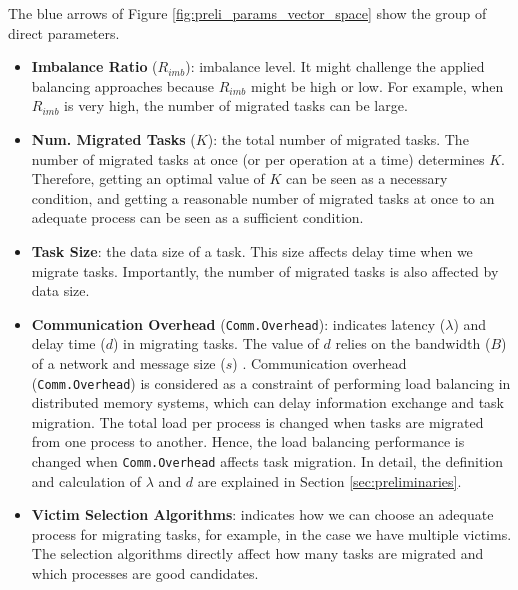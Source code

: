 The blue arrows of Figure \ref{fig:preli_params_vector_space} show the group of direct parameters.
\begin{itemize}
	\item \textbf{Imbalance Ratio} ($R_{imb}$): imbalance level. It might challenge the applied balancing approaches because $R_{imb}$ might be high or low. For example, when $R_{imb}$ is very high, the number of migrated tasks can be large.
	\item \textbf{Num. Migrated Tasks} ($K$): the total number of migrated tasks. The number of migrated tasks at once (or per operation at a time) determines $K$. Therefore, getting an optimal value of $K$ can be seen as a necessary condition, and getting a reasonable number of migrated tasks at once to an adequate process can be seen as a sufficient condition.
	\item \textbf{Task Size}: the data size of a task. This size affects delay time when we migrate tasks. Importantly, the number of migrated tasks is also affected by data size.
	\item \textbf{Communication Overhead} (\texttt{Comm.Overhead}): indicates latency ($\lambda$) and delay time ($d$) in migrating tasks. The value of $d$ relies on the bandwidth ($B$) of a network and message size ($s$) \cite{peterson2021computer}. Communication overhead (\texttt{Comm.Overhead}) is considered as a constraint of performing load balancing in distributed memory systems, which can delay information exchange and task migration. The total load per process is changed when tasks are migrated from one process to another. Hence, the load balancing performance is changed when \texttt{Comm.Overhead} affects task migration. In detail, the definition and calculation of $\lambda$ and $d$ are explained in Section \ref{sec:preliminaries}.
	\item \textbf{Victim Selection Algorithms}: indicates how we can choose an adequate process for migrating tasks, for example, in the case we have multiple victims. The selection algorithms directly affect how many tasks are migrated and which processes are good candidates.
\end{itemize}


